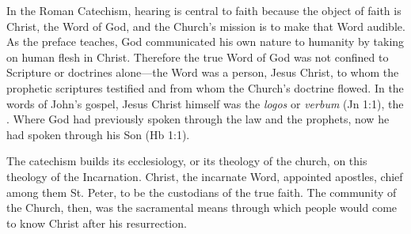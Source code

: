 In the Roman Catechism, hearing is central to faith because the object of faith
is Christ, the Word of God, and the Church's mission is to make that Word
audible.  
As the preface teaches, God communicated his own nature to humanity by taking on
human flesh in Christ.
Therefore the true Word of God was not confined to Scripture or doctrines
alone---the Word was a person, Jesus Christ, to whom the prophetic scriptures
testified and from whom the Church's doctrine flowed.%
    \Autocite
    [9: .]
    {Catholic:Catechismus1614}
In the words of John's gospel, Jesus Christ himself was the \emph{logos} or
\emph{verbum} (Jn 1:1), the .  
Where God had previously spoken through the law and the prophets, now he had
spoken through his Son (Hb 1:1).

The catechism builds its ecclesiology, or its theology of the church, on this
theology of the Incarnation.  
Christ, the incarnate Word, appointed apostles, chief among them St. Peter, to
be the custodians of the true faith.
The community of the Church, then, was the sacramental means through which
people would come to know Christ after his resurrection.

